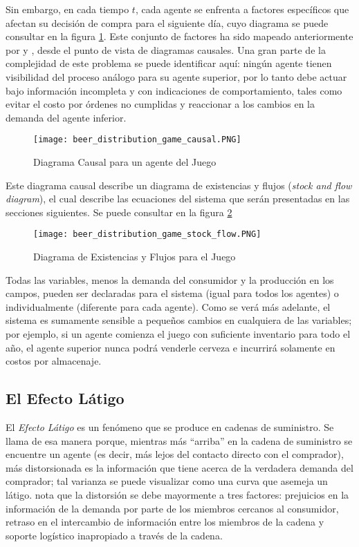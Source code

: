 Sin embargo, en cada tiempo $t$, cada agente se enfrenta a factores espec\'ificos que afectan su decisi\'on de compra para el siguiente d\'ia, cuyo diagrama se puede consultar en la figura \ref{causal}. Este conjunto de factores ha sido mapeado anteriormente por \citet{Duggan} y \citet{Grasl}, desde el punto de vista de diagramas causales. Una gran parte de la complejidad de este problema se puede identificar aqu\'i: ning\'un agente tienen visibilidad del proceso an\'alogo para su agente superior, por lo tanto debe actuar bajo informaci\'on incompleta y con indicaciones de comportamiento, tales como evitar el costo por \'ordenes no cumplidas y reaccionar a los cambios en la demanda del agente inferior.

\begin{figure}[ht]
\caption{Diagrama Causal para un agente del Juego}
\label{causal}
\texttt{[image: beer\_distribution\_game\_causal.PNG]}
\centering
\end{figure}

Este diagrama causal describe un diagrama de existencias y flujos (\textit{stock and flow diagram}), el cual describe las ecuaciones del sistema que ser\'an presentadas en las secciones siguientes. Se puede consultar en la figura \ref{stockflow}

\begin{figure}[ht]
\caption{Diagrama de Existencias y Flujos para el Juego}
\label{stockflow}
\texttt{[image: beer\_distribution\_game\_stock\_flow.PNG]}
\centering
\end{figure}

Todas las variables, menos la demanda del consumidor y la producci\'on en los campos, pueden ser declaradas para el sistema (igual para todos los agentes) o individualmente (diferente para cada agente). Como se ver\'a m\'as adelante, el sistema es sumamente sensible a peque\~nos cambios en cualquiera de las variables; por ejemplo, si un agente comienza el juego con suficiente inventario para todo el a\~no, el agente superior nunca podr\'a venderle cerveza e incurrir\'a solamente en costos por almacenaje.

\subsection{El Efecto Látigo}

El \textit{Efecto Látigo} es un fen\'omeno que se produce en cadenas de suministro. Se llama de esa manera porque, mientras m\'as ``arriba'' en la cadena de suministro se encuentre un agente (es decir, m\'as lejos del contacto directo con el comprador), m\'as distorsionada es la informaci\'on que tiene acerca de la verdadera demanda del comprador; tal varianza se puede visualizar como una curva que asemeja un l\'atigo. \citet{Chaharsooghi} nota que la distorsi\'on se debe mayormente a tres factores: prejuicios en la informaci\'on de la demanda por parte de los miembros cercanos al consumidor, retraso en el intercambio de informaci\'on entre los miembros de la cadena y soporte log\'istico inapropiado a trav\'es de la cadena. \\

